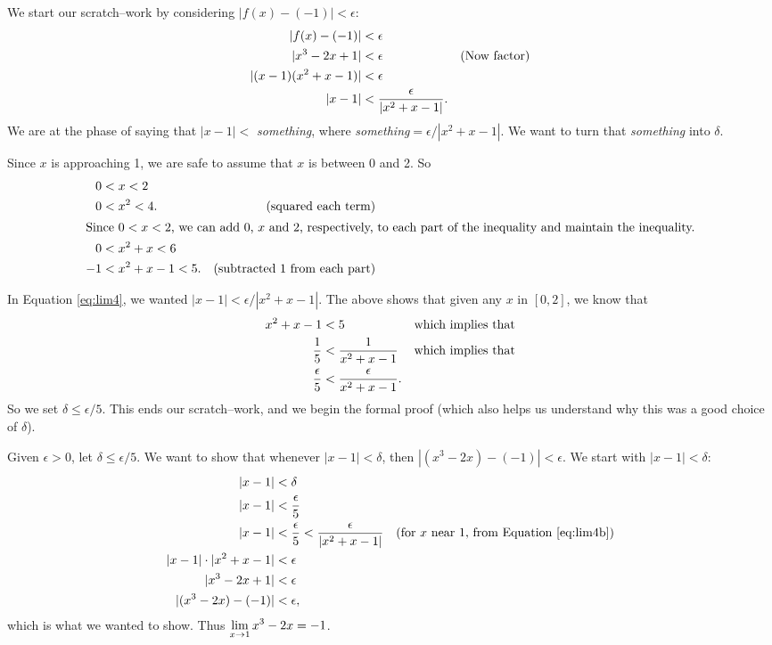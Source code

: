 {We start our scratch--work by considering $|f(x) - (-1)| < \epsilon$:
\begin{align}
|f(x)-(-1)| &< \epsilon \notag\\
|x^3-2x + 1|&< \epsilon & \text{(Now factor)}\notag\\
|(x-1)(x^2+x-1)|&< \epsilon \notag\\
|x-1| &<\frac{\epsilon}{|x^2+x-1|}.\label{eq:lim4}
\end{align}
We are at the phase of saying that $|x-1|<$ \textit{something}, where \textit{something}$=\epsilon/|x^2+x-1|$. We want to turn that \textit{something} into $\delta$.

Since $x$ is approaching 1, we are safe to assume that $x$ is between 0 and 2. So
\begin{align*}
0&< x<2  & \\
0&< x^2<4.&\text{(squared each term)}\\
\intertext{Since $0<x<2$, we can add $0$, $x$ and $2$, respectively, to each part of the inequality and maintain the inequality.}
0&< x^2+x<6 &\\
-1&< x^2+x-1<5.&\text{(subtracted 1 from each part)}
\end{align*}

In Equation \eqref{eq:lim4}, we wanted $|x-1|<\epsilon/|x^2+x-1|$. The above shows that given any $x$ in $[0,2]$, we know that 
\begin{align}
x^2+x-1 &< 5 &\text{which implies that}\notag\\
\frac15 &< \frac{1}{x^2+x-1} &\text{which implies that}\notag\\
\frac{\epsilon}5 &< \frac{\epsilon}{x^2+x-1}.\label{eq:lim4b}
\end{align}
 So we set $\delta \leq \epsilon/5$. This ends our scratch--work, and we begin the formal proof (which also helps us understand why this was a good choice of $\delta$).

Given $\epsilon>0$, let $\delta \leq \epsilon/5$. We want to show that whenever $|x-1|<\delta$, then $|(x^3-2x)-(-1)|<\epsilon$. We start with $|x-1|<\delta$:
\begin{align*}
|x-1| &< \delta \\
|x-1| &< \frac{\epsilon}5\\
|x-1| &< \frac\epsilon5 < \frac{\epsilon}{|x^2+x-1|} & \text{(for $x$ near 1, from Equation \eqref{eq:lim4b})}\\
|x-1|\cdot |x^2+x-1| &< \epsilon\\
|x^3-2x+1| &< \epsilon\\
|(x^3-2x)-(-1)| &<\epsilon,
\end{align*}
which is what we wanted to show. Thus $\displaystyle \lim_{x\to 1}x^3-2x = -1$.
}\\

